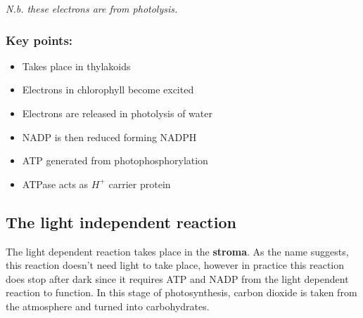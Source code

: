 \documentclass{article}
\begin{document}
\textit{N.b. these electrons are from photolysis.}

\subsubsection*{Key points:}
\begin{itemize}
    \item Takes place in thylakoids
    \item Electrons in chlorophyll become excited
    \item Electrons are released in photolysis of water
    \item NADP is then reduced forming NADPH
    \item ATP generated from photophosphorylation
		\item ATPase acts as $H^+$ carrier protein
\end{itemize}

\newpage
\subsection*{The light independent reaction}
The light dependent reaction takes place in the \textbf{stroma}. As the name suggests, this reaction doesn't need light to take place, however in practice this reaction does stop after dark since it requires ATP and NADP from the light dependent reaction to function. In this stage of photosynthesis, carbon dioxide is taken from the atmosphere and turned into carbohydrates.
\end{document}
